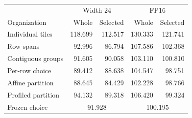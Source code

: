 \begin{tabular}{@{}lrrrr@{}}
\toprule
& \multicolumn{2}{c}{Width-24} & \multicolumn{2}{c}{FP16} \\
Organization & Whole & Selected & Whole & Selected \\
\midrule
Individual tiles & 118.699 & 112.517 & 130.333 & 121.741 \\
Row spans & 92.996 & 86.794 & 107.586 & 102.368 \\
Contiguous groups & 91.605 & 90.058 & 103.110 & 100.810 \\
Per-row choice & 89.412 & 88.638 & 104.547 & 98.751 \\
Affine partition & 88.645 & 84.429 & 102.228 & 98.766 \\
Profiled partition & 94.132 & 89.318 & 106.420 & 99.324 \\
\midrule
Frozen choice & \multicolumn{2}{c}{91.928} & \multicolumn{2}{c}{100.195} \\
\bottomrule
\end{tabular}
